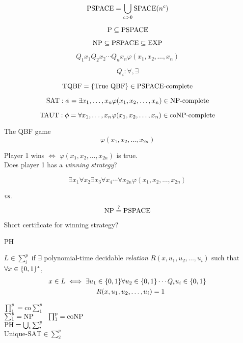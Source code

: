 \begin{frame}{\pspace}
  \[
	\text{PSPACE} = \bigcup_{c > 0} \text{SPACE}(n^c)
  \]

  \[
	\text{P} \subseteq \text{PSPACE}
  \]
  
  \[
	\text{NP} \subseteq \text{PSPACE} \subseteq \text{EXP}
  \]
\end{frame}
\begin{frame}{\pspacec}
  \begin{definition}
	\[
	  Q_1 x_1 Q_2 x_2 \cdots Q_n x_n \varphi(x_1, x_2, \ldots, x_n)
	\]

	\[
	  Q_i: \forall, \exists
	\]
  \end{definition}

  \[
	\text{TQBF} = \{\text{True QBF}\} \in \text{PSPACE-complete}
  \]

  \[
	\text{SAT}: \phi = \exists x_1,\ldots,x_n \varphi(x_1, x_2, \ldots, x_n) \in \text{NP-complete}
  \]

  \[
	\text{TAUT}: \phi = \forall x_1,\ldots,x_n \varphi(x_1, x_2, \ldots, x_n) \in \text{coNP-complete}
  \]
\end{frame}
\begin{frame}{\pspacec}
  \begin{exampleblock}{The QBF game}
	\[
	  \varphi(x_1,x_2,\dots,x_{2n})
	\]

	\begin{center}
	  Player 1 wins $\iff$ $\varphi(x_1,x_2,\dots,x_{2n})$ is true.\\[6pt]
	  Does player 1 has a \emph{winning strategy}?
	\end{center}

	\[
	  \exists x_1 \forall x_2 \exists x_3 \forall x_4 \cdots \forall x_{2n} \varphi(x_1,x_2,\dots,x_{2n})
	\]
  \end{exampleblock}
\end{frame}
\begin{frame}{\np{} \emph{vs.} \pspace}
  \[
	\text{NP} \stackrel{?}{=} \text{PSPACE}
  \]
  
  \centerline{Short certificate for winning strategy?}
\end{frame}
\begin{frame}{PH}
  \begin{definition}
	$L \in \sum_{i}^{p}$ if $\exists$ polynomial-time decidable \emph{relation} $R(x,u_1,u_2,\dots,u_i)$ such that $\forall x \in \{0,1\}^{\ast}$,
	\begin{align*}
	  x \in L \iff \exists u_1 &\in \{0,1\} \forall u_2 \in \{0,1\} \cdots Q_i u_i \in \{0,1\} \\
	 	 &R(x,u_1,u_2,\dots,u_i) = 1
	\end{align*}
  \end{definition}

  \begin{center}
	$\prod_{1}^{p} = \text{co}\sum_{1}^{p}$ \\[10pt]
	$\sum_{1}^{p} = \text{NP} \qquad \prod_{1}^{p} = \text{coNP}$ \\[10pt]
	$\text{PH} = \bigcup_{i} \sum_{i}^{p}$ \\[15pt]
	$\text{Unique-SAT} \in \sum_{2}^{p}$
  \end{center}
\end{frame}
